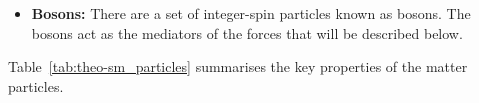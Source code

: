 \begin{itemize}[leftmargin=*]
\item\textbf{Bosons:}
  There are a set of integer-spin particles  known as bosons.
  The bosons act as the mediators of the forces that will be described below.  \vspace{1em}
  
\end{itemize}
  

\noindent
Table~\ref{tab:theo-sm_particles} summarises the key properties of the matter particles.

